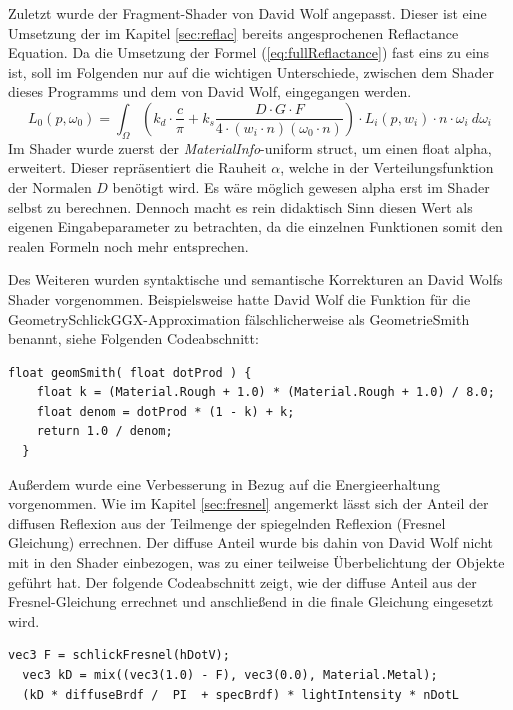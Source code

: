 \documentclass[
  11pt,
  a4paper,
  oneside
  ]{article}
\begin{document}
Zuletzt wurde der Fragment-Shader von David Wolf angepasst. Dieser ist eine Umsetzung der im Kapitel \ref{sec:reflac} bereits angesprochenen Reflactance Equation. Da die Umsetzung der Formel (\ref{eq:fullReflactance}) fast eins zu eins ist, soll im Folgenden nur auf die wichtigen Unterschiede, zwischen dem Shader dieses Programms und dem von David Wolf, eingegangen werden. 
\begin{equation}\label{eq:fullReflactance}
  L_{0}\left( p,\omega _{0}\right) =\int _{\Omega }^{}\left( k_{d}\cdot \dfrac{c}{\pi }+k_{s}\dfrac{D\cdot G\cdot F}{4\cdot \left( w_{i}\cdot n\right) \left( \omega _{0}\cdot n\right) }\right) \cdot L_{i}\left( p,w_{i}\right) \cdot n\cdot \omega _{i} \ d\omega _{i}
\end{equation} 
Im Shader wurde zuerst der \textit{MaterialInfo}-uniform struct, um einen float alpha, erweitert. Dieser repräsentiert die Rauheit $\alpha$, welche in der Verteilungsfunktion der Normalen $D$ benötigt wird. Es wäre möglich gewesen alpha erst im Shader selbst zu berechnen. Dennoch macht es rein didaktisch Sinn diesen Wert als eigenen Eingabeparameter zu betrachten, da die einzelnen Funktionen somit den realen Formeln noch mehr entsprechen. 

Des Weiteren wurden syntaktische und semantische Korrekturen an David Wolfs Shader vorgenommen. Beispielsweise hatte David Wolf die Funktion für die Geometry\-SchlickGGX-Approximation fälschlicherweise als GeometrieSmith benannt, siehe Folgenden Codeabschnitt:
\begin{lstlisting}[tabsize=2, caption={Geometrie-Funktion aus dem Fragment-Shader von David Wolf}]
  float geomSmith( float dotProd ) {
    float k = (Material.Rough + 1.0) * (Material.Rough + 1.0) / 8.0;
    float denom = dotProd * (1 - k) + k;
    return 1.0 / denom;
  }
\end{lstlisting}

Außerdem wurde eine Verbesserung in Bezug auf die Energieerhaltung vorgenommen. Wie im Kapitel \ref{sec:fresnel} angemerkt lässt sich der Anteil der diffusen Reflexion aus der Teilmenge der spiegelnden Reflexion (Fresnel Gleichung) errechnen. Der diffuse Anteil wurde bis dahin von David Wolf nicht mit in den Shader einbezogen, was zu einer teilweise Überbelichtung der Objekte geführt hat. Der folgende Codeabschnitt zeigt, wie der diffuse Anteil aus der Fresnel-Gleichung errechnet und anschließend in die finale Gleichung eingesetzt wird.
\begin{lstlisting}[tabsize=2, caption={Quellcode zur Berechnung des Anteiles der diffusen Strahlung}]
  vec3 F = schlickFresnel(hDotV);         
  vec3 kD = mix((vec3(1.0) - F), vec3(0.0), Material.Metal);
  (kD * diffuseBrdf /  PI  + specBrdf) * lightIntensity * nDotL
\end{lstlisting}
\end{document}

